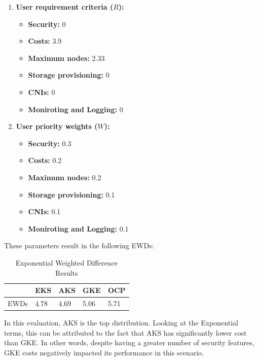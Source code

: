 \begin{enumerate}
\def\labelenumi{\arabic{enumi}.}
\tightlist
\item
  \textbf{User requirement criteria (\(R\)):}
    \begin{itemize}
  \tightlist
  \item
    \textbf{Security:} 0
  \item
    \textbf{Costs:} 3.9
  \item
    \textbf{Maximum nodes:} 2.33
  \item
    \textbf{Storage provisioning:} 0
  \item
    \textbf{CNIs:} 0
  \item
    \textbf{Moniroting and Logging:} 0
  \end{itemize}
\item
  \textbf{User priority weights (\(W\)):}

  \begin{itemize}
  \tightlist
  \item
    \textbf{Security:} 0.3
  \item
    \textbf{Costs:} 0.2
  \item
    \textbf{Maximum nodes:} 0.2
  \item
    \textbf{Storage provisioning:} 0.1
  \item
    \textbf{CNIs:} 0.1
  \item
    \textbf{Moniroting and Logging:} 0.1
  \end{itemize}
\end{enumerate}

These parameters result in the following EWDs:

\begin{table}[!ht]
    \centering
    \begin{tabular}{|p{4cm}|p{2cm}|p{2cm}|p{2cm}|p{2cm}|} %
    \hline
         & EKS& AKS& GKE& OCP\\ \hline
 EWDs& 4.78& 4.69 & 5.06 & 5.71 \\\hline
    \end{tabular}
    \caption{Exponential Weighted Difference Results} 
    \label{tab:cost-analysis}
\end{table}

In this evaluation, AKS is the top distribution. Looking at the Exponential terms, this can be attributed to the fact that AKS has significantly lower cost than GKE. In other words, despite having a greater number of security features, GKE costs negatively impacted its performance in this scenario.

